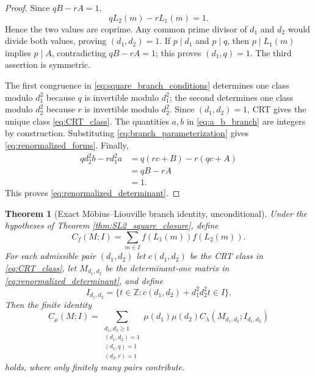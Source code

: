 \documentclass[11pt]{amsart}
\numberwithin{equation}{section}
\theoremstyle{plain}
\newtheorem{theorem}{Theorem}[section]
\theoremstyle{definition}
\theoremstyle{remark}
\newcommand{\Z}{\mathbb Z}
\newcommand{\mob}{\mu}
\newcommand{\liou}{\lambda}
\begin{document}
\begin{proof}
Since $qB-rA=1$,
\begin{equation}
qL_2(m)-rL_1(m)=1.
\label{eq:branch_bezout}
\end{equation}
Hence the two values are coprime.  Any common prime divisor of $d_1$ and $d_2$ would divide both values, proving $(d_1,d_2)=1$.  If $p\mid d_1$ and $p\mid q$, then $p\mid L_1(m)$ implies $p\mid A$, contradicting $qB-rA=1$; this proves $(d_1,q)=1$.  The third assertion is symmetric.

The first congruence in \eqref{eq:square_branch_conditions} determines one class modulo $d_1^2$ because $q$ is invertible modulo $d_1^2$; the second determines one class modulo $d_2^2$ because $r$ is invertible modulo $d_2^2$.  Since $(d_1,d_2)=1$, CRT gives the unique class \eqref{eq:CRT_class}.  The quantities $a,b$ in \eqref{eq:a_b_branch} are integers by construction.  Substituting \eqref{eq:branch_parameterization} gives \eqref{eq:renormalized_forms}.  Finally,
\begin{align}
qd_2^2b-rd_1^2a
&=q(rc+B)-r(qc+A)
\label{eq:determinant_branch_first}\\
&=qB-rA
\label{eq:determinant_branch_second}\\
&=1.
\label{eq:determinant_branch_final}
\end{align}
This proves \eqref{eq:renormalized_determinant}.
\end{proof}

\begin{theorem}[Exact Möbius--Liouville branch identity, unconditional]
\label{thm:exact_branch_identity}
Under the hypotheses of Theorem \ref{thm:SL2_square_closure}, define
\begin{equation}
C_f(M;I)=\sum_{m\in I}f(L_1(m))f(L_2(m)).
\label{eq:Cf_definition}
\end{equation}
For each admissible pair $(d_1,d_2)$ let $c(d_1,d_2)$ be the CRT class in \eqref{eq:CRT_class}, let $M_{d_1,d_2}$ be the determinant-one matrix in \eqref{eq:renormalized_determinant}, and define
\begin{equation}
I_{d_1,d_2}
=\{t\in\Z:c(d_1,d_2)+d_1^2d_2^2t\in I\}.
\label{eq:branch_interval}
\end{equation}
Then the finite identity
\begin{equation}
C_{\mob}(M;I)
=
\sum_{\substack{d_1,d_2\ge1\\(d_1,d_2)=1\\(d_1,q)=1\\(d_2,r)=1}}
\mob(d_1)\mob(d_2)
C_{\liou}(M_{d_1,d_2};I_{d_1,d_2})
\label{eq:exact_mu_lambda_branch_identity}
\end{equation}
holds, where only finitely many pairs contribute.
\end{theorem}
\end{document}
